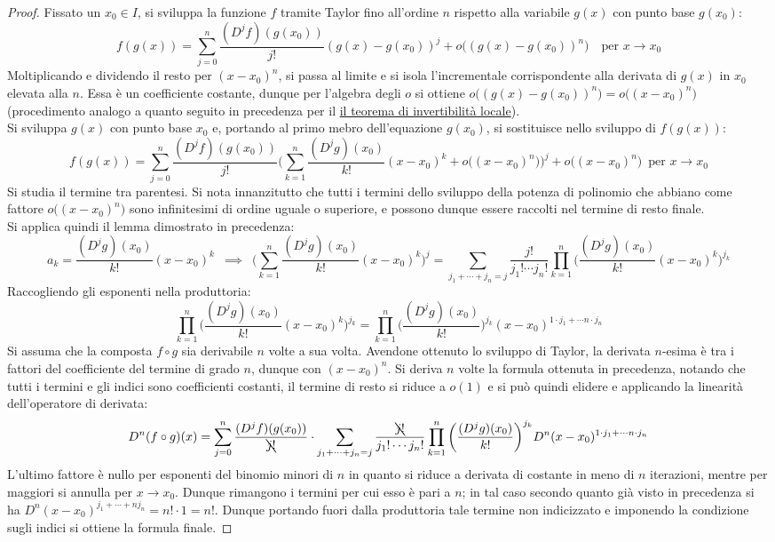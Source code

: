 \documentclass[10pt, oneside]{book}
\theoremstyle{plain}
\begin{document}
\begin{proof}
Fissato un $x_0 \in I$, si sviluppa la funzione $f$ tramite Taylor fino all'ordine $n$ rispetto alla variabile $g(x)$ con punto base $g(x_0)$:
\[f(g(x)) = \sum \limits_{j = 0}^n \frac{(D^jf)(g(x_0))}{j!}(g(x) - g(x_0))^j + o\big((g(x) - g(x_0))^n\big) \quad \textrm{per } x \rightarrow x_0\]
Moltiplicando e dividendo il resto per $(x - x_0)^n$, si passa al limite e si isola l'incrementale corrispondente alla derivata di $g(x)$ in $x_0$ elevata alla $n$. Essa è un coefficiente costante, dunque per l'algebra degli $o$ si ottiene $o\big((g(x) - g(x_0))^n\big) = o\big((x - x_0)^n\big)$ (procedimento analogo a quanto seguito in precedenza per il \hyperlink{cos}{il teorema di invertibilità locale}).
\\Si sviluppa $g(x)$ con punto base $x_0$ e, portando al primo mebro dell'equazione $g(x_0)$, si sostituisce nello sviluppo di $f(g(x))$:
\[f(g(x)) = \sum \limits_{j = 0}^n \frac{(D^jf)(g(x_0))}{j!} \bigg( \sum \limits_{k = 1}^n \frac{(D^jg)(x_0)}{k!}(x-x_0)^k + o\big((x-x_0)^n\big) \bigg)^j + o\big((x-x_0)^n\big) \enspace \textrm{per } x \rightarrow x_0\]
Si studia il termine tra parentesi. Si nota innanzitutto che tutti i termini dello sviluppo della potenza di polinomio che abbiano come fattore $o\big((x-x_0)^n\big)$ sono infinitesimi di ordine uguale o superiore, e possono dunque essere raccolti nel termine di resto finale.
\\Si applica quindi il lemma dimostrato in precedenza:
\[a_k = \frac{(D^jg)(x_0)}{k!}(x-x_0)^k \enspace \implies \enspace \bigg( \sum \limits_{k = 1}^n \frac{(D^jg)(x_0)}{k!}(x-x_0)^k \bigg)^j = \sum \limits_{j_1 + \cdots +j_n = j} \frac{j!}{j_1! \cdots j_n!} \prod \limits_{k=1}^{n}\bigg(\frac{(D^jg)(x_0)}{k!}(x-x_0)^k\bigg)^{j_k}\]
Raccogliendo gli esponenti nella produttoria:
\[\prod \limits_{k=1}^{n}\bigg(\frac{(D^jg)(x_0)}{k!}(x-x_0)^k\bigg)^{j_k} = \prod \limits_{k=1}^{n}\bigg(\frac{(D^jg)(x_0)}{k!}\bigg)^{j_k}(x-x_0)^{1 \cdot j_1 + \cdots n \cdot j_n}\]
Si assuma che la composta $f \circ g$ sia derivabile $n$ volte a sua volta. Avendone ottenuto lo sviluppo di Taylor, la derivata $n$-esima è tra i fattori del coefficiente del termine di grado $n$, dunque con $(x-x_0)^n$. Si deriva $n$ volte la formula ottenuta in precedenza, notando che tutti i termini e gli indici sono coefficienti costanti, il termine di resto si riduce a $o(1)$ e si può quindi elidere e applicando la linearità dell'operatore di derivata:
\[D^n(f \circ g) (x) = \sum \limits_{j = 0}^n \frac{(D^jf)(g(x_0))}{\bcancel{j!}} \cdot \sum \limits_{j_1 + \cdots +j_n = j} \frac{\bcancel{j!}}{j_1! \cdots j_n!} \prod \limits_{k=1}^{n}\bigg(\frac{(D^jg)(x_0)}{k!}\bigg)^{j_k}D^n(x-x_0)^{1 \cdot j_1 + \cdots n \cdot j_n}\]
L'ultimo fattore è nullo per esponenti del binomio minori di $n$ in quanto si riduce a derivata di costante in meno di $n$ iterazioni, mentre per maggiori si annulla per $x \rightarrow x_0$. Dunque rimangono i termini per cui esso è pari a $n$; in tal caso secondo quanto già visto in precedenza si ha $D^n (x-x_0)^{j_1 + \cdots + n j_n} = n! \cdot 1 = n!$. Dunque portando fuori dalla produttoria tale termine non indicizzato e imponendo la condizione sugli indici si ottiene la formula finale.
\end{proof}
\end{document}
